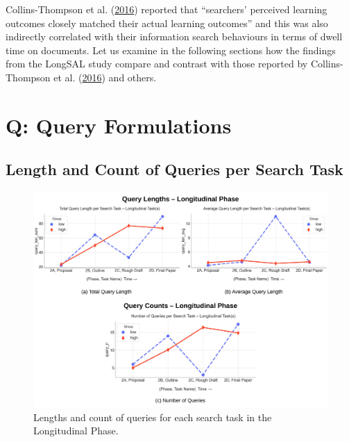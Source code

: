 \documentclass[letterpaper, nobind]{templates/ociamthesis}
\begin{document}
Collins-Thompson et al. (\protect\hyperlink{ref-collins2016assessing}{2016}) reported that ``searchers' perceived learning outcomes closely matched their actual learning outcomes'' and this was also indirectly correlated with their information search behaviours in terms of dwell time on documents.
Let us examine in the following sections how the findings from the LongSAL study compare and contrast with those reported by Collins-Thompson et al. (\protect\hyperlink{ref-collins2016assessing}{2016}) and others.

\hypertarget{q-query-formulations}{%
\section{Q: Query Formulations}\label{q-query-formulations}}

\hypertarget{length-and-count-of-queries-per-search-task}{%
\subsection{Length and Count of Queries per Search Task}\label{length-and-count-of-queries-per-search-task}}

\begin{figure}

{\centering \includegraphics[width=1\linewidth]{figs/rp2-query-length-count} 

}

\caption[Query length and counts -- longitudinal phase.]{Lengths and count of queries for each search task in the Longitudinal Phase.}\label{fig:rp2-query-length-count}
\end{figure}
\end{document}
